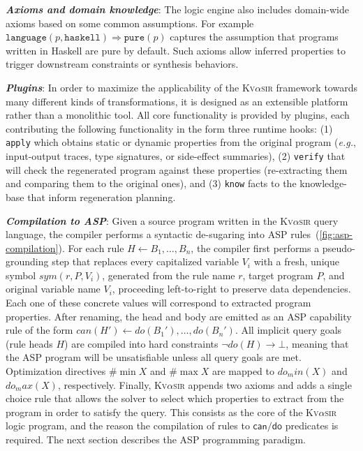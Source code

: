 \documentclass[nonacm,sigplan]{acmart}
\def\eg{{\em e.g.}, }
\newcommand{\sys}{{\scshape Kv{$\alpha$}sir}\xspace}
\newcommand{\heading}[1]{\vspace{2pt}\noindent\textbf{\emph{#1}}:\enspace}
\newcommand{\ttt}[1]{\texttt{#1}\xspace}
\begin{document}
\heading{Axioms and domain knowledge}
The logic engine also includes domain-wide axioms based on some common assumptions.
For example
$\ttt{language}(p, \ttt{haskell}) \Rightarrow \ttt{pure}(p)$
captures the assumption that programs written in Haskell are pure by default.
Such axioms allow inferred properties to trigger downstream constraints or synthesis behaviors.

\heading{Plugins}
In order to maximize the applicability of the \sys framework 
towards many different kinds of transformations,
it is designed as an extensible platform rather than a monolithic tool.
All core functionality is provided by plugins, each contributing
the following functionality in the form three runtime hooks:
(1) \ttt{apply} which obtains static or dynamic properties from the original program (\eg
input-output traces, type signatures, or side-effect summaries),
(2) \ttt{verify} that will check the regenerated program against these properties (re-extracting them and comparing them to the original ones),
and
(3) \ttt{know} facts to the knowledge-base that inform regeneration planning.

\heading{Compilation to ASP}
Given a source program written in the \sys query language, the compiler
performs a syntactic de-sugaring into ASP rules~(\cref{fig:asp-compilation}).
For each rule $H \leftarrow B_1,\dots,B_n$, the compiler first performs a
pseudo-grounding step that replaces every capitalized variable $V_i$ with a
fresh, unique symbol $\mathit{sym}(r,P,V_i)$, generated from the rule
name $r$, target program $P$, and original variable name $V_i$, proceeding
left-to-right to preserve data dependencies.
Each one of these concrete values will correspond to extracted program properties.
After renaming, the head and body
are emitted as an ASP capability rule of the form $\mathit{can}(H') \leftarrow
\mathit{do}(B_1'),\dots,\mathit{do}(B_n')$. 
All implicit query
goals (rule heads $H$) are compiled into hard constraints $\neg \mathit{do}(H) \rightarrow
\bot$, meaning that the ASP program will be unsatisfiable unless all query goals are met.
Optimization directives $\#\min X$ and $\#\max X$ are mapped to
$\mathit{do_min}(X)$ and $\mathit{do_max}(X)$, respectively.
Finally, \sys
appends two axioms and adds a single choice rule that allows the solver to select which properties to extract from the program in order to satisfy the query.
This consists as the core of the \sys logic program, and the reason the compilation of rules to $\mathsf{can}/\mathsf{do}$ predicates is required.
The next section describes the ASP programming paradigm.
\end{document}
